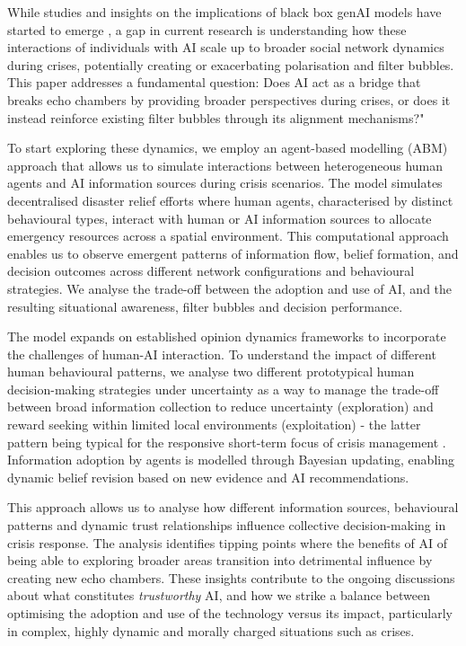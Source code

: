 \documentclass[pdflatex,sn-apa]{sn-jnl}%
\begin{document}
While studies and insights on the implications of black box genAI models have started to emerge \citep{zhang2024see, sharma2024generative}, a gap in current research is understanding how these interactions of individuals with AI scale up to broader social network dynamics during crises, potentially creating or exacerbating polarisation and filter bubbles. This paper addresses a fundamental question: Does AI act as a bridge that breaks echo chambers by providing broader perspectives during crises, or does it instead reinforce existing filter bubbles through its alignment mechanisms?"

To start exploring these dynamics, we employ an agent-based modelling (ABM) approach that allows us to simulate interactions between heterogeneous human agents and AI information sources during crisis scenarios. The model simulates decentralised disaster relief efforts where human agents, characterised by distinct behavioural types, interact with human or AI information sources to allocate emergency resources across a spatial environment. This computational approach enables us to observe emergent patterns of information flow, belief formation, and decision outcomes across different network configurations and behavioural strategies. We analyse the trade-off between the adoption and use of AI, and the resulting situational awareness, filter bubbles and decision performance. 

The model expands on established opinion dynamics frameworks \citep{geschke2019triple} to incorporate the challenges of human-AI interaction. To understand the impact of different human behavioural patterns, we analyse two different prototypical human decision-making strategies under uncertainty as a way to manage the trade-off between broad information collection to reduce uncertainty (exploration) and reward seeking within limited local environments (exploitation) - the latter pattern being typical for the responsive short-term focus of crisis management \citep{comes2020coordination}. Information adoption by agents is modelled through Bayesian updating, enabling dynamic belief revision based on new evidence and AI recommendations.

This approach allows us to analyse how different information sources, behavioural patterns and dynamic trust relationships influence collective decision-making in crisis response. The analysis identifies tipping points where the benefits of AI of being able to exploring broader areas transition into detrimental influence by creating new echo chambers. These insights contribute to the ongoing discussions about what constitutes \textit{trustworthy} AI, and how we strike a balance between optimising the adoption and use of the technology versus its impact, particularly in complex, highly dynamic and morally charged situations such as crises.
\end{document}

